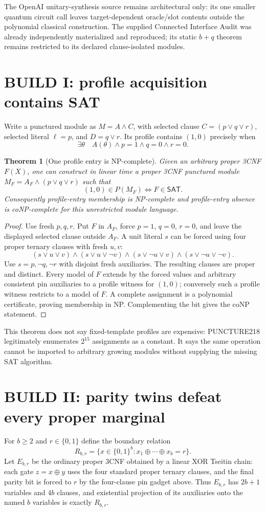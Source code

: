 \documentclass[11pt]{article}
\newtheorem{theorem}{Theorem}
\begin{document}
The OpenAI unitary-synthesis source remains architectural only: its one smaller quantum circuit call leaves target-dependent oracle/slot contents outside the polynomial classical construction.  The supplied Connected Interface Audit was already independently materialized and reproduced; its static $b+q$ theorem remains restricted to its declared clause-isolated modules.

\section{BUILD I: profile acquisition contains SAT}
Write a punctured module as $M=A\land C$, with selected clause
$C=(p\lor q\lor r)$, selected literal $\ell=p$, and $D=q\lor r$.  Its profile contains $(1,0)$ precisely when
\[
 \exists\theta\quad A(\theta)\wedge p=1\wedge q=0\wedge r=0.
\]

\begin{theorem}[One profile entry is NP-complete]
Given an arbitrary proper 3CNF $F(X)$, one can construct in linear time a proper 3CNF punctured module $M_F=A_F\land(p\lor q\lor r)$ such that
\[
 (1,0)\in P(M_F)\iff F\in\mathsf{SAT}.
\]
Consequently profile-entry membership is NP-complete and profile-entry absence is coNP-complete for this unrestricted module language.
\end{theorem}
\begin{proof}
Use fresh $p,q,r$.  Put $F$ in $A_F$, force $p=1$, $q=0$, $r=0$, and leave the displayed selected clause outside $A_F$.  A unit literal $s$ can be forced using four proper ternary clauses with fresh $u,v$:
\[
 (s\vee u\vee v)\wedge(s\vee u\vee\neg v)
 \wedge(s\vee\neg u\vee v)\wedge(s\vee\neg u\vee\neg v).
\]
Use $s=p,\neg q,\neg r$ with disjoint fresh auxiliaries.  The resulting clauses are proper and distinct.  Every model of $F$ extends by the forced values and arbitrary consistent pin auxiliaries to a profile witness for $(1,0)$; conversely such a profile witness restricts to a model of $F$.  A complete assignment is a polynomial certificate, proving membership in NP.  Complementing the bit gives the coNP statement.
\end{proof}

This theorem does not say fixed-template profiles are expensive: PUNCTURE218 legitimately enumerates $2^{15}$ assignments as a constant.  It says the same operation cannot be imported to arbitrary growing modules without supplying the missing SAT algorithm.

\section{BUILD II: parity twins defeat every proper marginal}
For $b\ge2$ and $r\in\{0,1\}$ define the boundary relation
\[
 R_{b,r}=\{x\in\{0,1\}^b:x_1\oplus\cdots\oplus x_b=r\}.
\]
Let $E_{b,r}$ be the ordinary proper 3CNF obtained by a linear XOR Tseitin chain: each gate $z=x\oplus y$ uses the four standard proper ternary clauses, and the final parity bit is forced to $r$ by the four-clause pin gadget above.  Thus $E_{b,r}$ has $2b+1$ variables and $4b$ clauses, and existential projection of its auxiliaries onto the named $b$ variables is exactly $R_{b,r}$.
\end{document}
